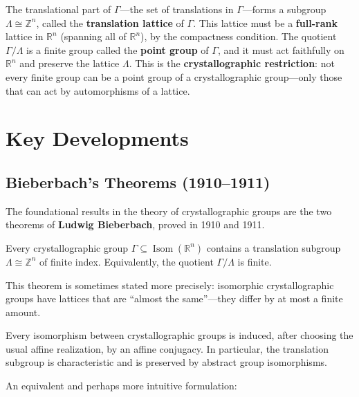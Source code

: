 The translational part of $\Gamma$---the set of translations in $\Gamma$---forms a subgroup $\Lambda \cong \mathbb{Z}^n$, called the \textbf{translation lattice} of $\Gamma$. This lattice must be a \textbf{full-rank} lattice in $\mathbb{R}^n$ (spanning all of $\mathbb{R}^n$), by the compactness condition. The quotient $\Gamma / \Lambda$ is a finite group called the \textbf{point group} of $\Gamma$, and it must act faithfully on $\mathbb{R}^n$ and preserve the lattice $\Lambda$. This is the \textbf{crystallographic restriction}: not every finite group can be a point group of a crystallographic group---only those that can act by automorphisms of a lattice.

\section{Key Developments}

\subsection{Bieberbach's Theorems (1910--1911)}

The foundational results in the theory of crystallographic groups are the two theorems of \textbf{Ludwig Bieberbach}, proved in 1910 and 1911.

\begin{theorem}\label{thm:bieberbach-1}
Every crystallographic group $\Gamma \subseteq \operatorname{Isom}(\mathbb{R}^n)$ contains a translation subgroup $\Lambda \cong \mathbb{Z}^n$ of finite index. Equivalently, the quotient $\Gamma/\Lambda$ is finite.
\end{theorem}

This theorem is sometimes stated more precisely: isomorphic crystallographic groups have lattices that are ``almost the same''---they differ by at most a finite amount.

\begin{theorem}\label{thm:bieberbach-2}
Every isomorphism between crystallographic groups is induced, after choosing the usual affine realization, by an affine conjugacy. In particular, the translation subgroup is characteristic and is preserved by abstract group isomorphisms.
\end{theorem}

An equivalent and perhaps more intuitive formulation:

